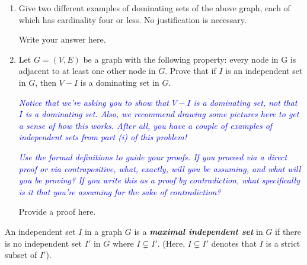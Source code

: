\documentclass{article}
\renewcommand{\(}{\left(}
\renewcommand{\)}{\right)}
\theoremstyle{plain}
\theoremstyle{plain}
\theoremstyle{definition}
\renewcommand{\emph}[1]{\textit{\textbf{#1}}}
\newcommand{\annotate}[1]{\textit{\textcolor{blue}{#1}}}
\begin{document}
\begin{enumerate}[resume*]
  \item Give two different examples of dominating sets of the above graph, each
    of which has cardinality four or less. No justification is necessary.
    \begin{shaded}
      Write your answer here.
    \end{shaded}

  \item Let $G = (V, E)$ be a graph with the following property: every node in
    G is adjacent to at least one other node in $G$. Prove that if $I$ is an
    independent set in $G$, then $V - I$ is a dominating set in $G$.

    \annotate{Notice that we're asking you to show that $V - I$ is a dominating
      set, not that $I$ is a dominating set. Also, we recommend drawing some
      pictures here to get a sense of how this works. After all, you have a
      couple of examples of independent sets from part (i) of this problem!}

    \annotate{Use the formal definitions to guide your proofs. If you proceed
      via a direct proof or via contrapositive, what, exactly, will you be
      assuming, and what will you be proving? If you write this as a proof by
      contradiction, what specifically is it that you're assuming for the sake
      of contradiction?}

    \begin{shaded}
      Provide a proof here.
    \end{shaded}
\end{enumerate}

An independent set $I$ in a graph $G$ is a \emph{maximal independent set} in
$G$ if there is no independent set $I'$ in $G$ where $I \subsetneq I'$. (Here,
$I \subsetneq I'$ denotes that $I$ is a strict subset of $I'$).
\end{document}
